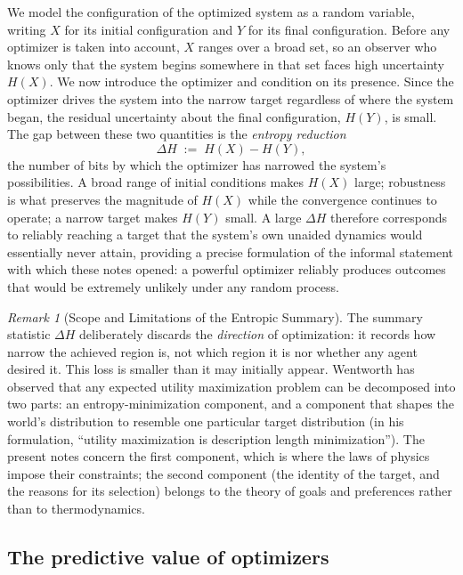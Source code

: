\documentclass[10pt]{article}
\theoremstyle{definition}
\theoremstyle{remark}
\newtheorem{remark}[theorem]{Remark}
\begin{document}
We model the configuration of the optimized system as a random variable, writing $X$ for its initial configuration and $Y$ for its final configuration. Before any optimizer is taken into account, $X$ ranges over a broad set, so an observer who knows only that the system begins somewhere in that set faces high uncertainty $H(X)$. We now introduce the optimizer and condition on its presence. Since the optimizer drives the system into the narrow target regardless of where the system began, the residual uncertainty about the final configuration, $H(Y)$, is small. The gap between these two quantities is the \emph{entropy reduction}
\[
\Delta H \;:=\; H(X) - H(Y),
\]
the number of bits by which the optimizer has narrowed the system's possibilities. A broad range of initial conditions makes $H(X)$ large; robustness is what preserves the magnitude of $H(X)$ while the convergence continues to operate; a narrow target makes $H(Y)$ small. A large $\Delta H$ therefore corresponds to reliably reaching a target that the system's own unaided dynamics would essentially never attain, providing a precise formulation of the informal statement with which these notes opened: a powerful optimizer reliably produces outcomes that would be extremely unlikely under any random process.

\begin{remark}[Scope and Limitations of the Entropic Summary]
\label{rem:translation}
The summary statistic $\Delta H$ deliberately discards the \emph{direction} of optimization: it records how narrow the achieved region is, not which region it is nor whether any agent desired it. This loss is smaller than it may initially appear. Wentworth has observed that any expected utility maximization problem can be decomposed into two parts: an entropy-minimization component, and a component that shapes the world's distribution to resemble one particular target distribution (in his formulation, ``utility maximization is description length minimization''). The present notes concern the first component, which is where the laws of physics impose their constraints; the second component (the identity of the target, and the reasons for its selection) belongs to the theory of goals and preferences rather than to thermodynamics.
\end{remark}

\subsection{The predictive value of optimizers}
\label{sec:prediction}
\end{document}
